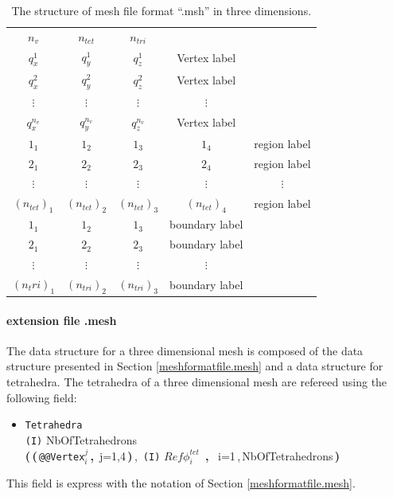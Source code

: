 \documentclass[a4paper,twoside,12pt]{book}
\begin{document}
\begin{table}[htbp]
\hspace*{3cm}
\begin{tabular}{|ccccc|}
\hline
$n_v$&  $n_{tet}$& $n_{tri}$ & &\\
$q^1_x$& $q^1_y$& $q^1_z$ & Vertex label &\\
$q^2_x$& $q^2_y$&  $q^2_z$ & Vertex label &\\
$\vdots$  &$\vdots$ &$\vdots$ &$\vdots$ &\\
$q^{n_v}_x$& $q^{n_v}_y$&  $q^{n_v}_z$ & Vertex label&\\
$1_1$& $1_2$& $1_3$& $1_4$ & region label \\
$2_1$& $2_2$& $2_3$& $2_4$ & region label  \\
$\vdots$  &$\vdots$ &$\vdots$ &$\vdots$  &$\vdots$ \\
$(n_{tet})_1$& $(n_{tet})_2$& $(n_{tet})_3  $& $(n_{tet})_4$ & region label \\
$1_1$ & $1_2$& $1_3$& boundary label & \\
$2_1$ & $2_2$& $2_3$& boundary label & \\
$\vdots$&  $\vdots$ &$\vdots$ &$\vdots$ &\\
$(n_tri)_{1}$ & $(n_{tri})_2$& $(n_{tri})_3$ & boundary label &\\
\hline
\end{tabular}
 \caption{The structure of mesh file format ``.msh'' in three dimensions.}
\label{tab:mesh3DSample}
\end{table}


\paragraph{extension file .mesh}
\def\Int#1{ {\tt(I)} #1}
\def\Vertex#1{{{\tt @@Vertex}#1}}
\def\Loop#1#2{{\bf\Large(}\,#1\,{\bf\Large{,\,\,}}\,#2\,{\bf\Large)}}

The data structure for a three dimensional mesh is composed of the data structure presented in Section \ref{meshformatfile.mesh}
and a data structure for tetrahedra. The tetrahedra of a three dimensional mesh are refereed using the following field:
\small
\begin{itemize}
\item {\tt{Tetrahedra}}\\
  \Int{NbOfTetrahedrons} \\
    \Loop{\Loop{\Vertex{$_i^j$}}{j=1,4}\,,\,\Int{$Ref \phi_i^{tet}$} }{ i=1\,,\,NbOfTetrahedrons}
\end{itemize}
This field is express with the notation of Section \ref{meshformatfile.mesh}.
\end{document}
